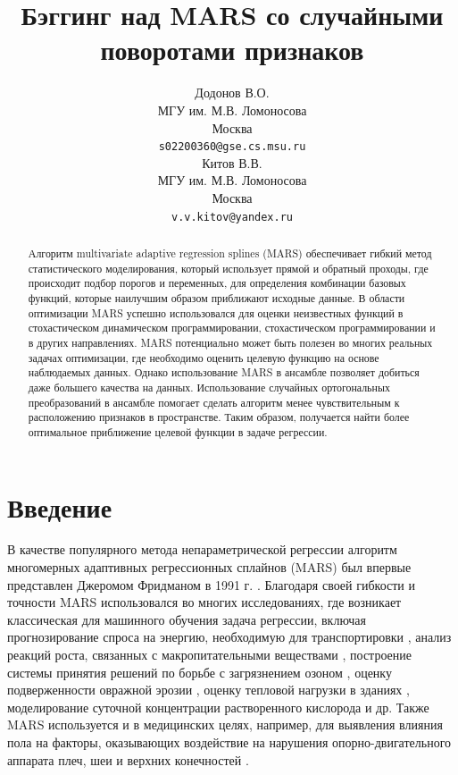\documentclass{article}
\title{Бэггинг над MARS со случайными поворотами признаков}
\author{ Додонов В.О.\\%
	МГУ им. М.В. Ломоносова\\
        Москва\\
	\texttt{s02200360@gse.cs.msu.ru} \\
	\And
        Китов В.В.\\
        МГУ им. М.В. Ломоносова\\
        Москва\\
	\texttt{v.v.kitov@yandex.ru} \\
}
\date{}
\newcommand{\cmmnt}[1]{}
\begin{document}
\maketitle


\begin{abstract}
Алгоритм multivariate adaptive regression splines (MARS) обеспечивает гибкий
метод статистического моделирования, который использует прямой и обратный проходы, где происходит подбор порогов и переменных, для определения комбинации
базовых функций, которые наилучшим образом приближают исходные данные.
В области оптимизации MARS успешно использовался для оценки неизвестных функций в стохастическом динамическом программировании, стохастическом программировании и в других направлениях. MARS потенциально может быть полезен во многих реальных задачах оптимизации, где необходимо оценить целевую функцию на основе наблюдаемых данных. Однако использование MARS в ансамбле позволяет добиться даже большего качества на данных. Использование случайных ортогональных преобразований в ансамбле помогает сделать алгоритм менее чувствительным к расположению признаков в пространстве. Таким образом, получается найти более оптимальное приближение целевой функции в задаче регрессии.
\end{abstract}



\section{Введение}
В качестве популярного метода непараметрической регрессии алгоритм 
многомерных адаптивных регрессионных сплайнов (MARS) был впервые представлен Джеромом Фридманом в 1991 г. \cite{friedman1991multivariate}. Благодаря своей гибкости и точности MARS использовался во многих исследованиях, где возникает классическая для машинного обучения задача регрессии, включая прогнозирование спроса на энергию, необходимую для транспортировки\cmmnt{(M.A. Sahraei, H. Duman, M.Y. Çodur et al, 2021)} \cite{sahraei2021prediction}, анализ реакций роста, связанных с макропитательными веществами \cmmnt{(M Akin et al, 2020)} \cite{akin2020analysis}, построение системы принятия решений по борьбе с загрязнением озоном \cmmnt{(Yang, Chen, Chang, Sattler, \& Wen, 2009)} \cite{yang2009decision}, оценку подверженности овражной эрозии \cmmnt{(Conoscenti, Agnesi, Cama, Caraballo-Arias, \& Rotigliano, 2018)} \cite{conoscenti2018assessment}, оценку тепловой нагрузки в зданиях \cmmnt{(Roy, Roy, \& Balas, 2018)} \cite{roy2018estimating}, моделирование суточной концентрации растворенного кислорода \cmmnt{(Heddam \& Kisi, 2018)} \cite{heddam2018modelling} и др.
Также MARS используется и в медицинских целях, например, для выявления влияния пола на факторы, оказывающих воздействие на нарушения опорно-двигательного аппарата плеч, шеи и верхних конечностей
\cmmnt{(Serrano, Sanchez, Lasheras, Iglesias-Rodríguez, \& Valverde, 2020)} \cite{serrano2020identification}.
\end{document}
